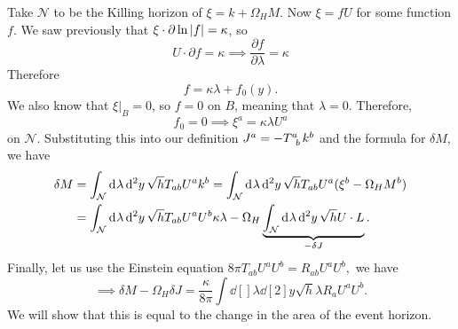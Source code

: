 Take $\mathcal{N}$ to be the Killing horizon of $\xi = k + \Omega_H M$.
Now $\xi = f U$ for some function $f$.
We saw previously that $\xi \cdot \partial \ln \abs{f} = \kappa$, so
\begin{equation}
  U \cdot \partial f = \kappa \implies \frac{\partial f}{\partial \lambda} = \kappa
\end{equation}
Therefore
\begin{equation}
  f = \kappa \lambda + f_0(y).
\end{equation}
We also know that $\xi \rvert_B = 0$, so $f = 0$ on $B$, meaning that $\lambda = 0$.
Therefore, 
\begin{equation}
  f_0  = 0 \implies \xi^{a} = \kappa \lambda U^{a}
\end{equation}
on $\mathcal{N}$.
Substituting this into our definition $J^{a} = -T\indices{^{a}_{b}} k^{b}$ and the formula for $\delta M$, we have
\begin{align}
  \delta M &= \int_\mathcal{N} \dd[]{\lambda} \dd[2]{y} \sqrt{h} T_{ab} U^{a} k^{b} = \int_\mathcal{N} \dd[]{\lambda} \dd[2]{y} \sqrt{h} T_{ab} U^{a} (\xi^{b} - \Omega_H M^{b}) \\
  &= \int_\mathcal{N} \dd[]{\lambda} \dd[2]{y} \sqrt{h} T_{ab} U^{a} U^{b} \kappa \lambda - \Omega_H \underbrace{\int_\mathcal{N} \dd[]{\lambda} \dd[2]{y} \sqrt{h} U \cdot L}_{\mathclap{- \delta J}}.
\end{align}
Finally, let us use the Einstein equation $ 8 \pi T_{ab} U^{a} U^{b} = R_{ab} U^{a} U^{b}, $ we have
\begin{equation}
  \implies \delta M - \Omega_H \delta J = \frac{\kappa}{8 \pi} \int \dd[]{\lambda} \dd[2]{y} \sqrt{h} \lambda R_{a} U^{a} U^{b}.
\end{equation}
We will show that this is equal to the change in the area of the event horizon.
